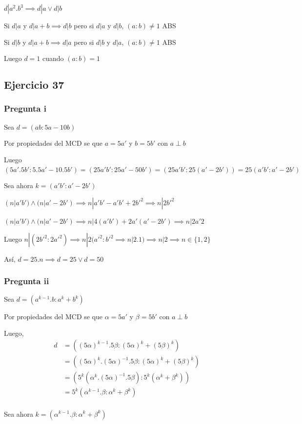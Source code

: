 $ d|a^2.b^3 \implies d|a \vee d|b $

Si $ d|a $ y $ d|a+b \implies d|b $ pero si $ d|a $ y $ d|b $, $ (a:b) \neq 1 $ ABS

Si $ d|b $ y $ d|a+b \implies d|a $ pero si $ d|b $ y $ d|a $, $ (a:b) \neq 1 $ ABS

Luego $ d = 1 $ cuando $ (a:b) = 1 $

\subsection{Ejercicio 37}
\subsubsection{Pregunta i}
Sea $ d = (ab:5a-10b) $

Por propiedades del MCD se que $ a = 5a' $ y $ b = 5b' $ con $ a\perp b $

Luego $ (5a'.5b':5.5a'-10.5b') = (25a'b':25a'-50b') = (25a'b':25(a'-2b')) = 25(a'b':a'-2b') $

Sea ahora $ k = (a'b':a'-2b') $

$ (n|a'b') \wedge (n|a'-2b') \implies n|a'b'-a'b'+2b'^2 \implies n|2b'^2 $

$ (n|a'b') \wedge (n|a'-2b') \implies n|4(a'b')+2a'(a'-2b') \implies n|2a'2 $

Luego $ n|(2b'^2:2a'^2) \implies n|2(a'^2:b'^2 \implies n|2.1) \implies n|2 \implies n\in \{ 1,2 \} $

Así, $ d = 25.n \implies d = 25 \vee d = 50$

\subsubsection{Pregunta ii}
Sea $ d = (a^{k-1}.b:a^k+b^k) $

Por propiedades del MCD se que $ \alpha = 5a' $ y $ \beta = 5b' $ con $ a\perp b $

Luego,
\begin{align*}
    d &= ( (5\alpha)^{k-1}.5\beta:(5\alpha)^k+(5\beta)^k ) \\  
    &= ( (5\alpha)^k. (5\alpha)^{-1}.5\beta: (5\alpha)^k+(5\beta)^k) \\
    &= ( 5^k(\alpha^k. (5\alpha)^{-1}.5\beta): 5^k(\alpha^k+\beta^k)) \\
    &= 5^k(\alpha^{k-1}.\beta: \alpha^k+\beta^k) \\
\end{align*}

Sea ahora $ k = (\alpha^{k-1}.\beta: \alpha^k+\beta^k) $

